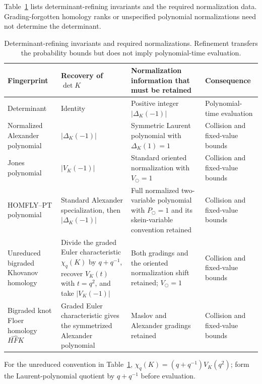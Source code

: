 \documentclass[9pt,twoside]{pnas-new}
\theoremstyle{definition}
\theoremstyle{remark}
\begin{document}
Table~\ref{tab:determinant-refinements} lists determinant-refining invariants and the required normalization data.  Grading-forgotten homology ranks or unspecified polynomial normalizations need not determine the determinant.

\begin{table}[ht]
\centering
\caption{Determinant-refining invariants and required normalizations.  Refinement transfers the probability bounds but does not imply polynomial-time evaluation.}
\label{tab:determinant-refinements}
\begin{tabularx}{\textwidth}{>{\raggedright\arraybackslash}p{}>{\raggedright\arraybackslash}p{}>{\raggedright\arraybackslash}X>{\raggedright\arraybackslash}p{}}
\toprule
Fingerprint & Recovery of $\det K$ & Normalization information that must be retained & Consequence \\
\midrule
Determinant & Identity & Positive integer $|\Delta_K(-1)|$ & Polynomial-time evaluation \\
Normalized Alexander polynomial & $|\Delta_K(-1)|$ & Symmetric Laurent polynomial with $\Delta_K(1)=1$ \cite{lickorish1997} & Collision and fixed-value bounds \\
Jones polynomial & $|V_K(-1)|$ & Standard oriented normalization with $V_{\bigcirc}=1$ \cite{jones1985} & Collision and fixed-value bounds \\
HOMFLY--PT polynomial & Standard Alexander specialization, then $|\Delta_K(-1)|$ & Full normalized two-variable polynomial with $P_{\bigcirc}=1$ and its skein-variable convention retained \cite{freydetal1985} & Collision and fixed-value bounds \\
Unreduced bigraded Khovanov homology & Divide the graded Euler characteristic $\chi_q(K)$ by $q+q^{-1}$, recover $V_K(t)$ with $t=q^2$, and take $|V_K(-1)|$ & Both gradings and the oriented normalization shift retained; $V_{\bigcirc}=1$ \cite{khovanov2000} & Collision and fixed-value bounds \\
Bigraded knot Floer homology $\widehat{HFK}$ & Graded Euler characteristic gives the symmetrized Alexander polynomial & Maslov and Alexander gradings retained \cite{ozsvathszabo2004} & Collision and fixed-value bounds \\
\bottomrule
\end{tabularx}
\end{table}

For the unreduced convention in Table~\ref{tab:determinant-refinements}, $\chi_q(K)=(q+q^{-1})V_K(q^2)$; form the Laurent-polynomial quotient by $q+q^{-1}$ before evaluation.
\end{document}
